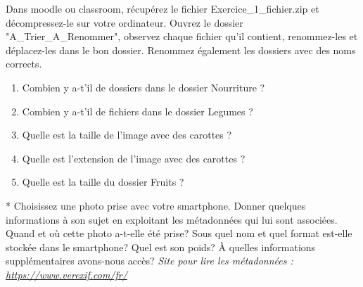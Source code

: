 \documentclass[11pt, a4paper]{book}
\begin{document}
\begin{exercice}
Dans moodle ou classroom, récupérez le fichier Exercice\_1\_fichier.zip et décompressez-le sur votre ordinateur.
Ouvrez le dossier "A\_Trier\_A\_Renommer", observez chaque fichier qu'il contient, renommez-les et déplacez-les dans le bon dossier. Renommez également les dossiers avec des noms corrects.
\begin{enumerate}
    \item Combien y a-t'il de dossiers dans le dossier Nourriture ?
    \item Combien y a-t'il de fichiers dans le dossier Legumes ?
    \item Quelle est la taille de l'image avec des carottes ?
    \item Quelle est l'extension de l'image avec des carottes ?
    \item Quelle est la taille du dossier Fruits ?
\end{enumerate}
\end{exercice}

\begin{exercice} *
Choisissez une photo prise avec votre smartphone. Donner quelques informations à son sujet en exploitant les métadonnées qui lui sont associées. Quand et où cette photo a-t-elle été prise? Sous quel nom et quel format est-elle stockée dans le smartphone? Quel est son poids? À quelles informations supplémentaires avons-nous accès?
\textit{Site pour lire les métadonnées : \url{https://www.verexif.com/fr/}}
\end{exercice}
\end{document}
